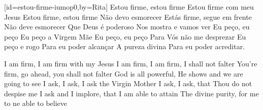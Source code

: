 %
%
\setcounter{ulSongNumber}{1}


[id={estou-firme-iumop0},by={Rita}]
  \beginverse
    \beginrep
      Estou firme, estou firme
      Estou firme com meu Jesus
    \endrep
    \beginrep
      Estou firme, estou firme
      Não devo esmorecer
    \endrep
  \endverse
  \beginverse
    \beginrep
      Estás firme, segue em frente
      Não deve esmorecer
    \endrep
    \beginrep
      Que Deus é poderoso
      Nos mostra e vamos ver
    \endrep
  \endverse
  \beginverse
    \beginrep
      Eu peço, eu peço
      Eu peço a Virgem Mãe
    \endrep
    \beginrep
      Eu peço, eu peço
      Para Vós não me desprezar
    \endrep
  \endverse
  \beginverse
    \beginrep
      Eu peço e rogo
      Para eu poder alcançar
    \endrep
    \beginrep
      A pureza divina
      Para eu poder acreditar.
    \endrep
  \endverse
  \begin{translation}[EN]
    I am firm, I am firm with my Jesus
    I am firm, I am firm, I shall not falter
    \nextverse
    You're firm, go ahead, you shall not falter
    God is all powerful, He shows and we are going to see
    \nextverse
    I ask, I ask, I ask the Virgin Mother
    I ask, I ask, that Thou do not despise me
    \nextverse
    I ask and I implore, that I am able to attain
    The divine purity, for me to ne able to believe
  \end{translation}
\endsong


